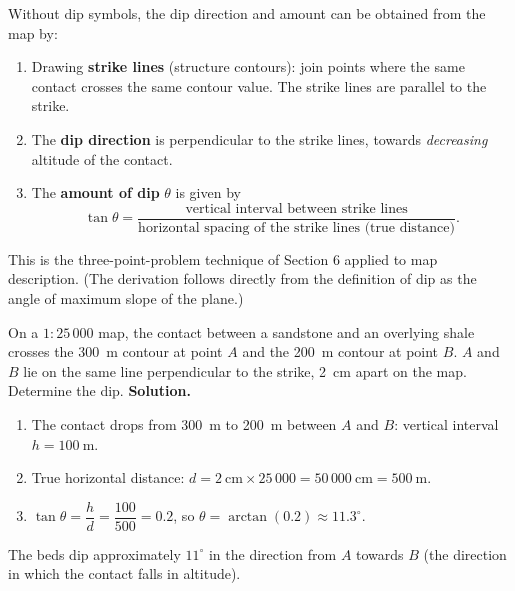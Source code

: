 \documentclass[11pt]{article}
\begin{document}
\begin{propriete}
Without dip symbols, the dip direction and amount can be obtained from the map by:
\begin{enumerate}
\item Drawing \textbf{strike lines} (structure contours): join points where the same contact crosses the same contour value. The strike lines are parallel to the strike.
\item The \textbf{dip direction} is perpendicular to the strike lines, towards \emph{decreasing} altitude of the contact.
\item The \textbf{amount of dip} $\theta$ is given by
\[ \tan\theta = \frac{\text{vertical interval between strike lines}}{\text{horizontal spacing of the strike lines (true distance)}}. \]
\end{enumerate}
This is the three-point-problem technique of Section 6 applied to map description. (The derivation follows directly from the definition of dip as the angle of maximum slope of the plane.)
\end{propriete}

\begin{exoresolu}
On a $1:25\,000$ map, the contact between a sandstone and an overlying shale crosses the \SI{300}{m} contour at point $A$ and the \SI{200}{m} contour at point $B$. $A$ and $B$ lie on the same line perpendicular to the strike, \SI{2}{cm} apart on the map. Determine the dip.
\tcblower
\textbf{Solution.}
\begin{enumerate}
\item The contact drops from \SI{300}{m} to \SI{200}{m} between $A$ and $B$: vertical interval $h = 100\ \mathrm{m}$.
\item True horizontal distance: $d = 2\ \mathrm{cm} \times 25\,000 = 50\,000\ \mathrm{cm} = 500\ \mathrm{m}$.
\item $\tan\theta = \dfrac{h}{d} = \dfrac{100}{500} = 0.2$, so $\theta = \arctan(0.2) \approx 11.3^\circ$.
\end{enumerate}
The beds dip approximately $11^\circ$ in the direction from $A$ towards $B$ (the direction in which the contact falls in altitude).
\end{exoresolu}
\end{document}
